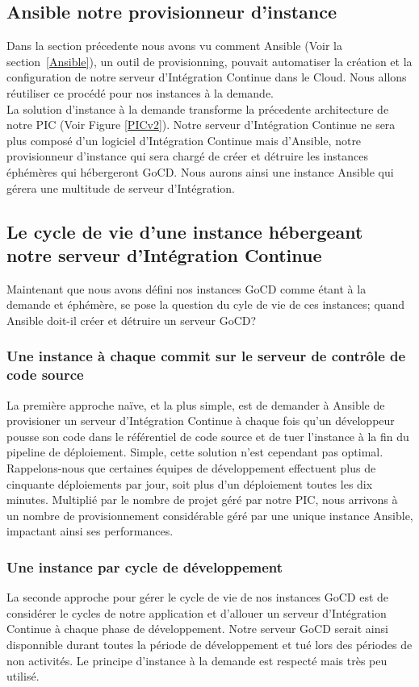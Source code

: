         \subsection{Ansible notre provisionneur d'instance}
        Dans la section précedente nous avons vu comment Ansible (Voir la section~\ref{Ansible}), un outil de provisionning, pouvait automatiser la création et la configuration de notre serveur d'Intégration Continue dans le Cloud. Nous allons réutiliser ce procédé pour nos instances à la demande.\\

        La solution d'instance à la demande transforme la précedente architecture de notre PIC (Voir Figure \ref{PICv2}). Notre serveur d'Intégration Continue ne sera plus composé d'un logiciel d'Intégration Continue mais d'Ansible, notre provisionneur d'instance qui sera chargé de créer et détruire les instances éphémères qui hébergeront GoCD. Nous aurons ainsi une instance Ansible qui gérera une multitude de serveur d'Intégration.

        \subsection{Le cycle de vie d'une instance hébergeant notre serveur d'Intégration Continue}
        Maintenant que nous avons défini nos instances GoCD comme étant à la demande et éphémère, se pose la question du cyle de vie de ces instances; quand Ansible doit-il créer et détruire un serveur GoCD?\\

          \subsubsection{Une instance à chaque commit sur le serveur de contrôle de code source}
          La première approche naïve, et la plus simple, est de demander à Ansible de provisioner un serveur d'Intégration Continue à chaque fois qu'un développeur pousse son code dans le référentiel de code source et de tuer l'instance à la fin du pipeline de déploiement. Simple, cette solution n'est cependant pas optimal. Rappelons-nous que certaines équipes de développement effectuent plus de cinquante déploiements par jour, soit plus d'un déploiement toutes les dix minutes. Multiplié par le nombre de projet géré par notre PIC, nous arrivons à un nombre de provisionnement considérable géré par une unique instance Ansible, impactant ainsi ses performances.

          \subsubsection{Une instance par cycle de développement}
          La seconde approche pour gérer le cycle de vie de nos instances GoCD est de considérer le cycles de notre application et d'allouer un serveur d'Intégration Continue à chaque phase de développement. Notre serveur GoCD serait ainsi disponnible durant toutes la période de développement et tué lors des périodes de non activités. Le principe d'instance à la demande est respecté mais très peu utilisé.

